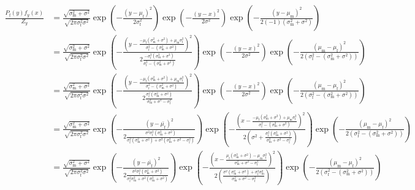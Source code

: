 \documentclass{article}\usepackage[]{graphicx}\usepackage[]{color}
\newcommand{\x}[1]{\text{#1}}
\begin{document}
\begin{landscape}
\begin{align*}
\frac{P_\x{f}(y)f_y(x)}{Z_y}&=\frac{\sqrt{\sigma_\x{m}^2+\sigma^2}}{\sqrt{2\pi\sigma_\x{f}^2\sigma^2}}\exp\left(-\frac{(y-\mu_\x{f})^2}{2\sigma_\x{f}^2}\right)\exp\left(-\frac{(y-x)^2}{2\sigma^2}\right)\exp\left(-\frac{(y-\mu_\x{m})^2}{2(-1)(\sigma_\x{m}^2+\sigma^2)}\right)
\\ &=\frac{\sqrt{\sigma_\x{m}^2+\sigma^2}}{\sqrt{2\pi\sigma_\x{f}^2\sigma^2}}\exp\left(-\frac{\left(y-\frac{-\mu_\x{f}(\sigma_\x{m}^2+\sigma^2)+\mu_\x{m}\sigma_\x{f}^2}{\sigma_\x{f}^2-(\sigma_\x{m}^2+\sigma^2)}\right)^2}{2\frac{-\sigma_\x{f}^2(\sigma_\x{m}^2+\sigma^2)}{\sigma_\x{f}^2-(\sigma_\x{m}^2+\sigma^2)}}\right)\exp\left(-\frac{(y-x)^2}{2\sigma^2}\right)\exp\left(-\frac{(\mu_\x{m}-\mu_\x{f})^2}{2(\sigma_\x{f}^2-(\sigma_\x{m}^2+\sigma^2))}\right)
\\&=\frac{\sqrt{\sigma_\x{m}^2+\sigma^2}}{\sqrt{2\pi\sigma_\x{f}^2\sigma^2}}\exp\left(-\frac{\left(y-\frac{-\mu_\x{f}(\sigma_\x{m}^2+\sigma^2)+\mu_\x{m}\sigma_\x{f}^2}{\sigma_\x{f}^2-(\sigma_\x{m}^2+\sigma^2)}\right)^2}{2\frac{\sigma_\x{f}^2(\sigma_\x{m}^2+\sigma^2)}{\sigma_\x{m}^2+\sigma^2-\sigma_\x{f}^2}}\right)\exp\left(-\frac{(y-x)^2}{2\sigma^2}\right)\exp\left(-\frac{(\mu_\x{m}-\mu_\x{f})^2}{2(\sigma_\x{f}^2-(\sigma_\x{m}^2+\sigma^2))}\right)
\\&=\frac{\sqrt{\sigma_\x{m}^2+\sigma^2}}{\sqrt{2\pi\sigma_\x{f}^2\sigma^2}}\exp\left(-\frac{\left(y-\bar{\mu_\x{f}}\right)^2}{2\frac{\sigma^2\sigma_\x{f}^2(\sigma_\x{m}^2+\sigma^2)}{\sigma_\x{f}^2(\sigma_\x{m}^2+\sigma^2)+\sigma^2(\sigma_\x{m}^2+\sigma^2-\sigma_\x{f}^2)}}\right)\exp\left(-\frac{\left(x-\frac{-\mu_\x{f}(\sigma_\x{m}^2+\sigma^2)+\mu_\x{m}\sigma_\x{f}^2}{\sigma_\x{f}^2-(\sigma_\x{m}^2+\sigma^2)}\right)^2}{2(\sigma^2+\frac{\sigma_\x{f}^2(\sigma_\x{m}^2+\sigma^2)}{\sigma_\x{m}^2+\sigma^2-\sigma_\x{f}^2})}\right)\exp\left(-\frac{(\mu_\x{m}-\mu_\x{f})^2}{2(\sigma_\x{f}^2-(\sigma_\x{m}^2+\sigma^2))}\right)
\\&=\frac{\sqrt{\sigma_\x{m}^2+\sigma^2}}{\sqrt{2\pi\sigma_\x{f}^2\sigma^2}}\exp\left(-\frac{\left(y-\bar{\mu_\x{f}}\right)^2}{2\frac{\sigma^2\sigma_\x{f}^2(\sigma_\x{m}^2+\sigma^2)}{\sigma_\x{f}^2\sigma_\x{m}^2+\sigma^2(\sigma_\x{m}^2+\sigma^2)}}\right)\exp\left(-\frac{\left(x-\frac{\mu_\x{f}(\sigma_\x{m}^2+\sigma^2)-\mu_\x{m}\sigma_\x{f}^2}{\sigma_\x{m}^2+\sigma^2-\sigma_\x{f}^2}\right)^2}{2\left(\frac{\sigma^2(\sigma_\x{m}^2+\sigma^2)+\sigma_\x{f}^2\sigma_\x{m}^2}{\sigma_\x{m}^2+\sigma^2-\sigma_\x{f}^2}\right)}\right)\exp\left(-\frac{(\mu_\x{m}-\mu_\x{f})^2}{2(\sigma_\x{f}^2-(\sigma_\x{m}^2+\sigma^2))}\right)

\end{align*}
\end{landscape}
\end{document}
